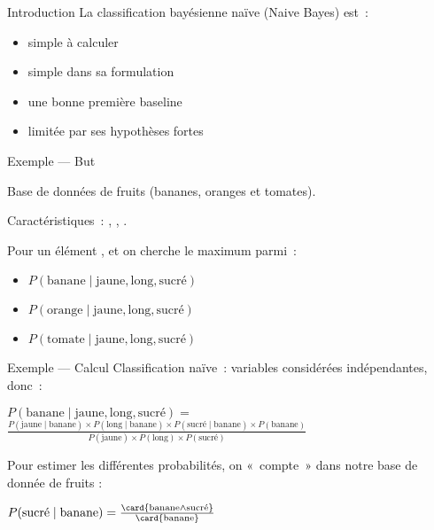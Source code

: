 \begin{frame}{Introduction}
  La classification bayésienne naïve (Naive Bayes) est~:
  \begin{itemize}[<+(1)->]
    \item simple à calculer
    \item simple dans sa formulation
    \item une bonne première baseline
    \item limitée par ses hypothèses fortes
  \end{itemize}
\end{frame}

\begin{frame}{Exemple --- But}
  \def\banane{\text{banane}}%
  \def\orange{\text{orange}}%
  \def\tomate{\text{tomate}}%
  \def\jaune{\text{jaune}}%
  \def\longg{\text{long}}%
  \def\sucre{\text{sucré}}%

  Base de données de fruits (bananes, oranges et tomates).

  Caractéristiques~: , , .

  Pour un élément \jaune{}, \longg{} et \sucre{} on cherche le maximum parmi~:
  \begin{itemize}
  \item $P(\banane \mid \jaune, \longg, \sucre)$
  \item $P(\orange \mid \jaune, \longg, \sucre)$
  \item $P(\tomate \mid \jaune, \longg, \sucre)$
  \end{itemize}
\end{frame}

\begin{frame}{Exemple --- Calcul}
  \def\banane{\text{banane}}%
  \def\orange{\text{orange}}%
  \def\tomate{\text{tomate}}%
  \def\jaune{\text{jaune}}%
  \def\longg{\text{long}}%
  \def\sucre{\text{sucré}}%
  Classification naïve~: variables considérées indépendantes, donc~:

  \begin{center}
    $P(\banane \mid \jaune, \longg, \sucre) =$\\
    $\;$\\
    $ \frac{P(\jaune \mid \banane) \times P(\longg \mid \banane) \times P(\sucre \mid \banane) \times P(\banane)}%
    {P(\jaune) \times P(\longg) \times P(\sucre)}$
  \end{center}
  Pour estimer les différentes probabilités, on «~compte~» dans notre base de donnée de fruits :\\
  \begin{center}
    $P(\sucre \mid \banane) = \frac{\card{\banane \land \sucre}}{\card{\banane}}$
  \end{center}
\end{frame}
